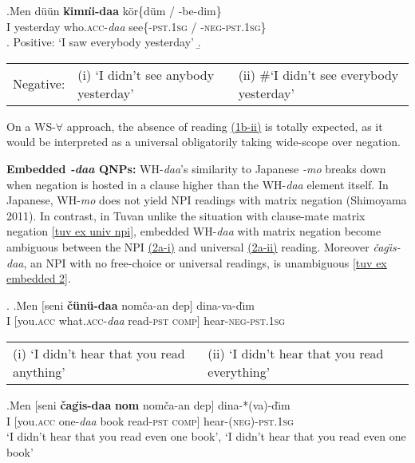 \documentclass[11pt]{article}
\newcommand{\changis}{\v{c}a\textipa{N}g\"{\i}s}
\begin{document}
\vspace{-8pt}
\exg.\label{tuv ex univ npi}Men d\"{u}\"{u}n \textbf{k\"{\i}mn\"{\i}-daa} k\"{o}r\{d\"{u}m / -be-dim\}\\
I yesterday who.\textsc{acc}-\textit{daa} see\{\textsc{-pst.1sg} / \textsc{-neg-pst.1sg}\}\\
\a.\label{pos 1} Positive: `I saw everybody yesterday'
\b.\label{neg 1}\hspace{-7pt}\begin{tabular}[t]{lll}
    Negative: & (i) `I didn't see anybody yesterday' & (ii) \#`I didn't see everybody yesterday'\\
\end{tabular}
\vspace{-8pt}

On a WS-$\forall$ approach, the absence of reading \hyperref[neg 1]{(1b-ii)} is totally expected, as it would be interpreted as a universal obligatorily taking wide-scope over negation.

\noindent\textbf{Embedded \textit{-daa} QNPs: } WH-\textit{daa}'s similarity to Japanese \textit{-mo} breaks down when negation is hosted in a clause higher than the WH-\textit{daa} element itself.  In Japanese, WH-\textit{mo} does not yield NPI readings with matrix negation (Shimoyama 2011).  In contrast, in Tuvan unlike the situation with clause-mate matrix negation \ref{tuv ex univ npi}, embedded WH-\textit{daa} with matrix negation become ambiguous between the NPI \hyperref[tuv ex embedded 1]{(2a-i)} and universal \hyperref[tuv ex embedded 1]{(2a-ii)} reading.  Moreover \textit{\changis-daa}, an NPI with no free-choice or universal readings, is unambiguous \ref{tuv ex embedded 2}.

\vspace{-8pt}
\ex.\label{tuv ex embedded}
\ag.\label{tuv ex embedded 1}Men $[$seni \textbf{\v{c}\"{u}n\"{u}-daa} nom\v{c}a-an dep$]$ dina-va-d\"{\i}m\\
I $[$you.\textsc{acc} what.\textsc{acc}-\textit{daa} read-\textsc{pst} \textsc{comp}$]$ hear-\textsc{neg-pst.1sg}\\
\hspace{-7pt}\begin{tabular}[t]{ll}
    (i) `I didn't hear that you read anything' & (ii) `I didn't hear that you read everything' \\
\end{tabular}
\bg.\label{tuv ex embedded 2}Men $[$seni \textbf{\changis-daa} \textbf{nom} nom\v{c}a-an dep$]$ dina-*(va)-d\"{\i}m\\
I $[$you.\textsc{acc} one-\textit{daa} book read-\textsc{pst} \textsc{comp}$]$ hear-\textsc{(neg)-pst.1sg}\\
`I didn't hear that you read even one book', `I didn't hear that you read even one book'
\vspace{-8pt}
\end{document}
